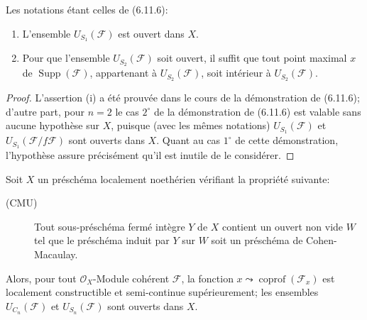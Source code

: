 \begin{corollary}[6.11.7]
\label{IV.2.s6.11.7-fr}
Les notations étant celles de \textup{(6.11.6)}:
\begin{enumerate}
\item[\textup{(i)}] L'ensemble $U_{S_1}(\mathcal F)$ est ouvert dans $X$.
\item[\textup{(ii)}] Pour que l'ensemble $U_{S_2}(\mathcal F)$ soit ouvert, il suffit
que tout point maximal $x$ de $\operatorname{Supp}(\mathcal F)$,
appartenant à $U_{S_2}(\mathcal F)$, soit intérieur à
$U_{S_2}(\mathcal F)$.
\end{enumerate}
\end{corollary}

\begin{proof}
L'assertion (i) a été prouvée dans le cours de la démonstration de (6.11.6);
d'autre part, pour $n=2$ le cas $2^\circ$ de la démonstration de (6.11.6)
est valable sans aucune hypothèse sur $X$, puisque (avec les mêmes
notations) $U_{S_1}(\mathcal F)$ et
$U_{S_1}(\mathcal F/f\mathcal F)$ sont ouverts dans $X$. Quant au cas
$1^\circ$ de cette démonstration, l'hypothèse assure précisément qu'il est
inutile de le considérer.
\end{proof}

\begin{proposition}[6.11.8]
\label{IV.2.s6.11.8-fr}
Soit $X$ un préschéma localement noethérien vérifiant la propriété suivante:
\begin{description}
\item[\textmd{(CMU)}] Tout sous-préschéma fermé intègre $Y$ de $X$ contient un ouvert
non vide $W$ tel que le préschéma induit par $Y$ sur $W$ soit un préschéma
de Cohen-Macaulay.
\end{description}

Alors, pour tout $\mathcal O_X$-Module cohérent $\mathcal F$, la fonction
$x\leadsto\operatorname{coprof}(\mathcal F_x)$ est localement constructible
et semi-continue supérieurement; les ensembles $U_{C_n}(\mathcal F)$ et
$U_{S_n}(\mathcal F)$ sont ouverts dans $X$.
\end{proposition}

